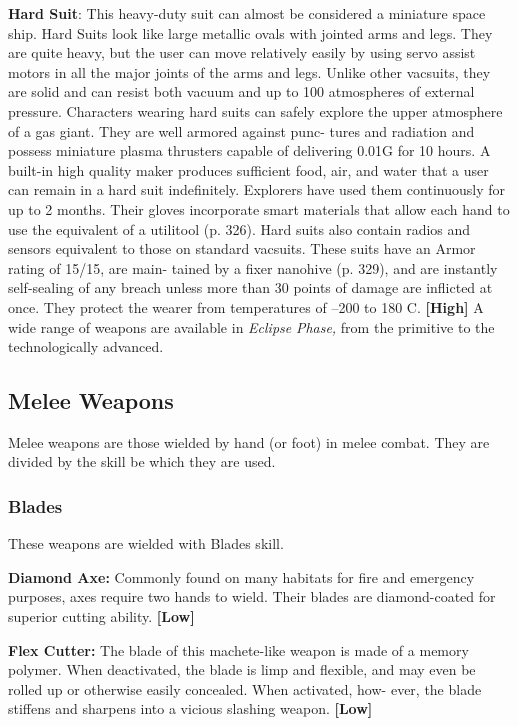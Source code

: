 \textbf{Hard Suit}: This heavy-duty suit can almost be 
considered a miniature space ship. Hard Suits look 
like large metallic ovals with jointed arms and legs. 
They are quite heavy, but the user can move relatively 
easily by using servo assist motors in all the major 
joints of the arms and legs. Unlike other vacsuits, they 
are solid and can resist both vacuum and up to 100 
atmospheres of external pressure. Characters wearing 
hard suits can safely explore the upper atmosphere 
of a gas giant. They are well armored against punc-
tures and radiation and possess miniature plasma 
thrusters capable of delivering 0.01G for 10 hours. A 
built-in high quality maker produces sufficient food, 
air, and water that a user can remain in a hard suit 
indefinitely. Explorers have used them continuously 
for up to 2 months. Their gloves incorporate smart 
materials that allow each hand to use the equivalent 
of a utilitool (p. 326). Hard suits also contain radios 
and sensors equivalent to those on standard vacsuits. 
These suits have an Armor rating of 15/15, are main-
tained by a fixer nanohive (p. 329), and are instantly 
self-sealing of any breach unless more than 30 points 
of damage are inflicted at once. They protect the 
wearer from temperatures of –200 to 180 C. \textbf{[High]}
A wide range of weapons are available in \textit{Eclipse }
\textit{Phase,} from the primitive to the technologically 
advanced.

\subsection{Melee Weapons}

Melee weapons are those wielded by hand (or foot) in 
melee combat. They are divided by the skill be which 
they are used.

\subsubsection{Blades}

These weapons are wielded with Blades skill.

\textbf{Diamond Axe:} Commonly found on many habitats 
for fire and emergency purposes, axes require two 
hands to wield. Their blades are diamond-coated for 
superior cutting ability. \textbf{[Low]}

\textbf{Flex Cutter:} The blade of this machete-like weapon 
is made of a memory polymer. When deactivated, the 
blade is limp and flexible, and may even be rolled up 
or otherwise easily concealed. When activated, how-
ever, the blade stiffens and sharpens into a vicious 
slashing weapon. \textbf{[Low]}


